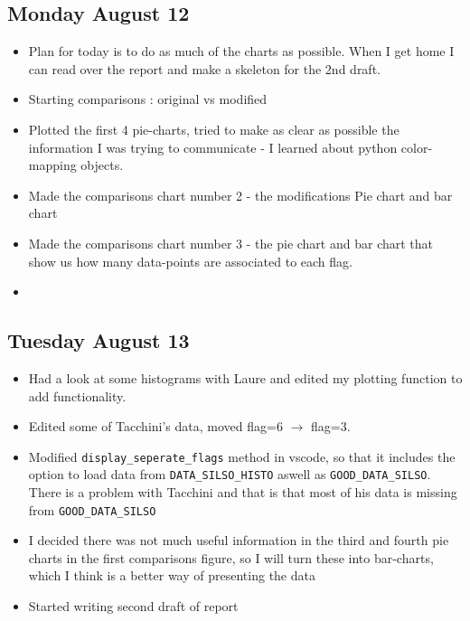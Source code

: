 \documentclass[12pt]{article}
\begin{document}
\subsection{Monday August 12}
\begin{itemize}
    \item Plan for today is to do as much of the charts as possible. When I get home I can read over the report and make a skeleton for the 2nd draft.
    \item Starting comparisons : original vs modified
    \item Plotted the first 4 pie-charts, tried to make as clear as possible the information I was trying to communicate - I learned about python color-mapping objects.
    \item Made the comparisons chart number 2 - the modifications Pie chart and bar chart
    \item Made the comparisons chart number 3 - the pie chart and bar chart that show us how many data-points are associated to each flag.
    \item 
\end{itemize}

\subsection{Tuesday August 13}
\begin{itemize}
    \item Had a look at some histograms with Laure and edited my plotting function to add functionality.
    \item Edited some of Tacchini's data, moved flag=6 $\to$ flag=3. 
    \item Modified \texttt{display\_seperate\_flags} method in vscode, so that it includes the option to load data from \texttt{DATA\_SILSO\_HISTO} aswell as \texttt{GOOD\_DATA\_SILSO}. There is a problem with Tacchini and that is that most of his data is missing from \texttt{GOOD\_DATA\_SILSO}
    \item I decided there was not much useful information in the third and fourth pie charts in the first comparisons figure, so I will turn these into bar-charts, which I think is a better way of presenting the data
    \item Started writing second draft of report
\end{itemize}





\newpage
\end{document}
